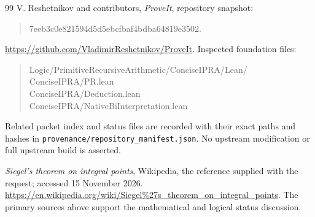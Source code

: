 \begin{thebibliography}{99}
V. Reshetnikov and contributors,
\emph{ProveIt}, repository snapshot:
\begin{quote}\small\ttfamily
7eeb3c0e821594d5d5ebcfbaf4bdba64819e3502.
\end{quote}
\url{https://github.com/VladimirReshetnikov/ProveIt}.
Inspected foundation files:
\begin{quote}\small\ttfamily
Logic/PrimitiveRecursiveArithmetic/ConciseIPRA/Lean/\\
ConciseIPRA/PR.lean\\
ConciseIPRA/Deduction.lean\\
ConciseIPRA/NativeBiInterpretation.lean
\end{quote}
Related packet index and status files are recorded with their exact
paths and hashes in \texttt{provenance/repository\_manifest.json}.
No upstream modification or full upstream build is asserted.

\emph{Siegel's theorem on integral points}, Wikipedia,
the reference supplied with the request; accessed 15 November 2026.
\url{https://en.wikipedia.org/wiki/Siegel\%27s_theorem_on_integral_points}.
The primary sources above support the mathematical and logical
status discussion.

\end{thebibliography}
\endgroup

